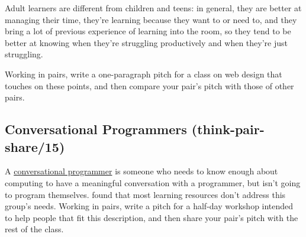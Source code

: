 Adult learners are different from children and teens: in general, they
are better at managing their time, they're learning because they want to
or need to, and they bring a lot of previous experience of learning into
the room, so they tend to be better at knowing when they're struggling
productively and when they're just struggling.

Working in pairs, write a one-paragraph pitch for a class on web design
that touches on these points, and then compare your pair's pitch with
those of other pairs.

\subsection{Conversational Programmers (think-pair-share/15)}\label{conversational-programmers-think-pair-share15}

A \protect\hyperlink{g:conversational-programmer}{conversational programmer}
is someone who needs to know enough about computing to have a meaningful
conversation with a programmer, but isn't going to program themselves.
\cite{Wang2018} found that most learning resources don't address this
group's needs. Working in pairs, write a pitch for a half-day workshop
intended to help people that fit this description, and then share your
pair's pitch with the rest of the class.
